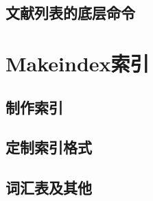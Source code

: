 \documentclass[a4paper, titlepage, hyperref, UTF8]{article}	%
\begin{document}
\subsection{文献列表的底层命令}


\section{Makeindex索引}
\subsection{制作索引}

\subsection{定制索引格式}
\subsection{词汇表及其他}



\end{document}
